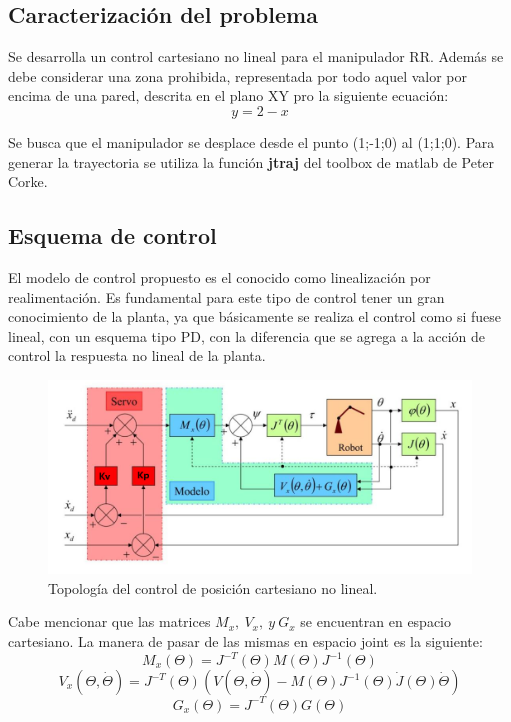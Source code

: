 %

%

\subsection{Caracterización del problema}
Se desarrolla un control cartesiano no lineal para el manipulador RR. Además se debe considerar una zona prohibida, representada por todo aquel valor por encima de una pared, descrita en el plano XY pro la siguiente ecuación:
\begin{equation}
y=2-x
\end{equation}

Se busca que el manipulador se desplace desde el punto (1;-1;0) al (1;1;0). Para generar la trayectoria se utiliza la función \textbf{jtraj} del toolbox de matlab de Peter Corke.

\subsection{Esquema de control}
El modelo de control propuesto es el conocido como linealización por realimentación. Es fundamental para este tipo de control tener un gran conocimiento de la planta, ya que básicamente se realiza el control como si fuese lineal, con un esquema tipo PD, con la diferencia que se agrega a la acción de control la respuesta no lineal de la planta.

\begin{figure}[H]
	\centering
	\includegraphics[width=0.8\linewidth]{ImagenesControl de posición no lineal/modelo_control_p}
	\caption{Topología del control de posición cartesiano no lineal.}	
	\label{fig:control_p_modelo}
\end{figure}

Cabe mencionar que las matrices $M_x,\ V_x, \ y \ G_x$ se encuentran en espacio cartesiano. La manera de pasar de las mismas en espacio joint es la siguiente:
\begin{equation*}
M_x(\Theta) = J^{-T}(\Theta) M(\Theta) J^{-1}(\Theta)
\end{equation*} 
\begin{equation*}
V_x(\Theta , \dot{\Theta}) = J^{-T}(\Theta) \left( V(\Theta , \dot{\Theta}) - M(\Theta) J^{-1}(\Theta) \dot{J}(\Theta) \dot{\Theta} \right)
\end{equation*} 
\begin{equation*}
G_x(\Theta) = J^{-T}(\Theta) G(\Theta) 
\end{equation*}

